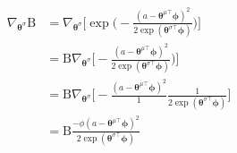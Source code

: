 \documentclass{article}
\begin{document}
\begin{align*}
\nabla_{\bm{\theta}^\sigma} \text{B} &= \nabla_{\bm{\theta}^\sigma} \bigg[ \exp\bigg(- \frac{(a - \bm{\theta}^{\mu\top}\bm{\phi})^2}{2\exp(\bm{\theta}^{\sigma\top}\bm{\phi})}\bigg)\bigg]\\
&= \text{B}\nabla_{\bm{\theta}^\sigma} \bigg[ - \frac{(a - \bm{\theta}^{\mu\top}\bm{\phi})^2}{2\exp(\bm{\theta}^{\sigma\top}\bm{\phi})})\bigg]\\
&= \text{B}\nabla_{\bm{\theta}^\sigma} \bigg[ - \frac{(a - \bm{\theta}^{\mu\top}\bm{\phi})^2}{1}\frac{1}{2\exp(\bm{\theta}^{\sigma\top}\bm{\phi})}\bigg]\\
&= \text{B}\frac{{-\phi} (a - \bm{\theta}^{\mu\top}\bm{\phi})^2}{2\exp(\bm{\theta}^{\sigma\top}\bm{\phi})}\\
\end{align*}




	
\end{document}
